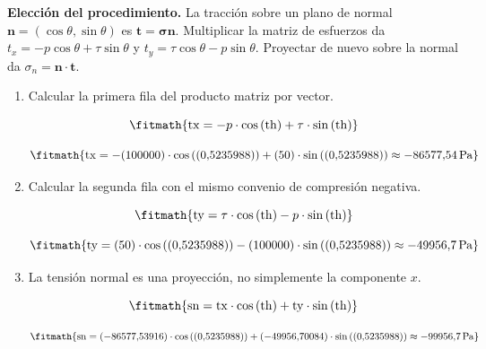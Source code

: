 \noindent\textbf{Elección del procedimiento.} La tracción sobre un plano de normal $\boldsymbol n=(\cos\theta,\sin\theta)$ es $\boldsymbol t=\boldsymbol\sigma\boldsymbol n$. Multiplicar la matriz de esfuerzos da $t_x=-p\cos\theta+\tau\sin\theta$ y $t_y=\tau\cos\theta-p\sin\theta$. Proyectar de nuevo sobre la normal da $\sigma_n=\boldsymbol n\cdot\boldsymbol t$.

\begin{enumerate}

\item Calcular la primera fila del producto matriz por vector.

\[\fitmath{\mathrm{tx}=-p\cdot \cos\left(\mathrm{th}\right)+\tau\cdot \sin\left(\mathrm{th}\right)}\]

\[\fitmath{\mathrm{tx}=-(100000)\cdot \cos\left((0{,}5235988)\right)+(50)\cdot \sin\left((0{,}5235988)\right)\approx -86577{,}54\,\mathrm{Pa}}\]

\item Calcular la segunda fila con el mismo convenio de compresión negativa.

\[\fitmath{\mathrm{ty}=\tau\cdot \cos\left(\mathrm{th}\right)-p\cdot \sin\left(\mathrm{th}\right)}\]

\[\fitmath{\mathrm{ty}=(50)\cdot \cos\left((0{,}5235988)\right)-(100000)\cdot \sin\left((0{,}5235988)\right)\approx -49956{,}7\,\mathrm{Pa}}\]

\item La tensión normal es una proyección, no simplemente la componente $x$.

\[\fitmath{\mathrm{sn}=\mathrm{tx}\cdot \cos\left(\mathrm{th}\right)+\mathrm{ty}\cdot \sin\left(\mathrm{th}\right)}\]

\[\fitmath{\mathrm{sn}=(-86577{,}53916)\cdot \cos\left((0{,}5235988)\right)+(-49956{,}70084)\cdot \sin\left((0{,}5235988)\right)\approx -99956{,}7\,\mathrm{Pa}}\]

\end{enumerate}

